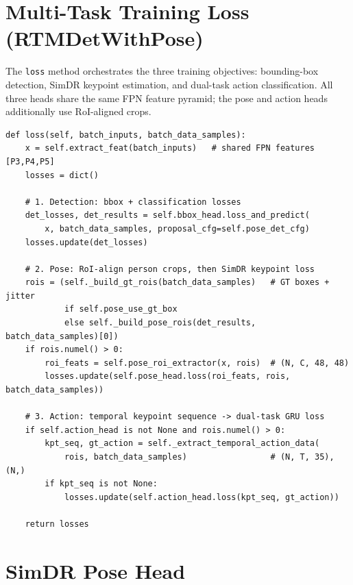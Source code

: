 
\lstset{style=pythonstyle}

\section{Multi-Task Training Loss (RTMDetWithPose)}

The \texttt{loss} method orchestrates the three training objectives:
bounding-box detection, SimDR keypoint estimation, and dual-task action
classification. All three heads share the same FPN feature pyramid; the
pose and action heads additionally use RoI-aligned crops.

\begin{lstlisting}[caption={RTMDetWithPose.loss -- three-task combined loss},
                   label={lst:rtmdet-loss}]
def loss(self, batch_inputs, batch_data_samples):
    x = self.extract_feat(batch_inputs)   # shared FPN features [P3,P4,P5]
    losses = dict()

    # 1. Detection: bbox + classification losses
    det_losses, det_results = self.bbox_head.loss_and_predict(
        x, batch_data_samples, proposal_cfg=self.pose_det_cfg)
    losses.update(det_losses)

    # 2. Pose: RoI-align person crops, then SimDR keypoint loss
    rois = (self._build_gt_rois(batch_data_samples)   # GT boxes + jitter
            if self.pose_use_gt_box
            else self._build_pose_rois(det_results, batch_data_samples)[0])
    if rois.numel() > 0:
        roi_feats = self.pose_roi_extractor(x, rois)  # (N, C, 48, 48)
        losses.update(self.pose_head.loss(roi_feats, rois, batch_data_samples))

    # 3. Action: temporal keypoint sequence -> dual-task GRU loss
    if self.action_head is not None and rois.numel() > 0:
        kpt_seq, gt_action = self._extract_temporal_action_data(
            rois, batch_data_samples)                 # (N, T, 35), (N,)
        if kpt_seq is not None:
            losses.update(self.action_head.loss(kpt_seq, gt_action))

    return losses
\end{lstlisting}

\section{SimDR Pose Head }

